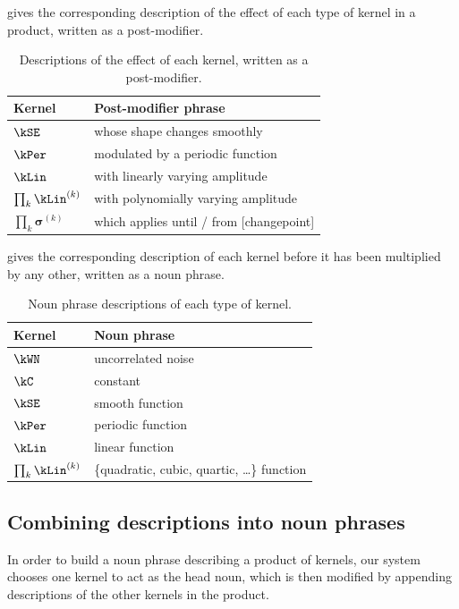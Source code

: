  gives the corresponding description of the effect of each type of kernel in a product, written as a post-modifier.
%
\begin{table}[h!]
\centering
\begin{tabular}{l|l}
Kernel & Post-modifier phrase \\
\midrule
$\kSE$  & whose shape changes smoothly \\
$\kPer$ & modulated by a periodic function \\
$\kLin$ & with linearly varying amplitude \\
$\prod_k \kLin^{(k)}$ & with polynomially varying amplitude \\
$\prod_k \boldsymbol{\sigma}^{(k)}$ & which applies until / from [changepoint] \\
\end{tabular}
\caption[Descriptions of the effect of each kernel, written as a post-modifier]{
Descriptions of the effect of each kernel, written as a post-modifier.
}
\label{table:modifiers}
\end{table}

 gives the corresponding description of each kernel before it has been multiplied by any other, written as a noun phrase.
%
\begin{table}[h!]
\centering
\begin{tabular}{l|l}
Kernel & Noun phrase \\
\midrule
$\kWN$  & uncorrelated noise \\
$\kC$   & constant \\
$\kSE$  & smooth function \\
$\kPer$ & periodic function \\
$\kLin$ & linear function \\
$\prod_k \kLin^{(k)}$ & \{quadratic, cubic, quartic, \dots \} function %
\end{tabular}
\caption[Noun phrase descriptions of each type of kernel]{
Noun phrase descriptions of each type of kernel.}
\label{table:nouns}
\end{table}



\subsection{Combining descriptions into noun phrases}

In order to build a noun phrase describing a product of kernels, our system chooses one kernel to act as the head noun, which is then modified by appending descriptions of the other kernels in the product.

